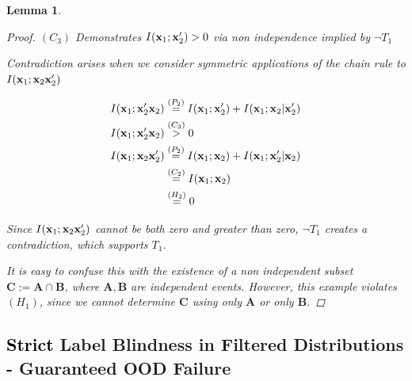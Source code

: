 \documentclass{article} %
\theoremstyle{plain}
\newtheorem{lemma}[theorem]{Lemma}
\theoremstyle{definition}
\theoremstyle{remark}
\begin{document}
\begin{lemma}
\begin{proof}
    $(C_3)$ Demonstrates $I({\mathbf{x}}_1;{\mathbf{x}}_2') > 0$ via non independence implied by $\neg T_1$
    
    Contradiction arises when we consider symmetric applications of the chain rule to $I({\mathbf{x}}_1;{\mathbf{x}}_2 {\mathbf{x}}_2')$

    $$
    \begin{aligned}
    I({\mathbf{x}}_1;{\mathbf{x}}_2' {\mathbf{x}}_2) &\stackrel{\left(P_2\right)}{=} I({\mathbf{x}}_1;{\mathbf{x}}_2') + I({\mathbf{x}}_1;{\mathbf{x}}_2|{\mathbf{x}}_2') \\
    I({\mathbf{x}}_1;{\mathbf{x}}_2' {\mathbf{x}}_2) &\stackrel{\left(C_3\right)}{>} 0 \\
    I({\mathbf{x}}_1;{\mathbf{x}}_2 {\mathbf{x}}_2') &\stackrel{\left(P_2\right)}{=} I({\mathbf{x}}_1;{\mathbf{x}}_2) + I({\mathbf{x}}_1;{\mathbf{x}}_2'|{\mathbf{x}}_2) \\
    &\stackrel{\left(C_2\right)}{=} I({\mathbf{x}}_1;{\mathbf{x}}_2)\\
    &\stackrel{\left(H_2\right)}{=} 0 \\
    \end{aligned}
    $$
       
    Since $I({\mathbf{x}}_1;{\mathbf{x}}_2 {\mathbf{x}}_2')$ cannot be both zero and greater than zero, $\neg T_1$ creates a contradiction, which supports $T_1$. 

    It is easy to confuse this with the existence of a non independent subset $\mathbf{C} := \mathbf{A \cap B}$,  where $\mathbf{A}, \mathbf{B}$ are independent events. However, this example violates $(H_1)$, since we cannot determine $\mathbf{C}$ using only $\mathbf{A}$ or only $\mathbf{B}$.

    
    
\end{proof}
\label{filter}
\end{lemma}


\subsection{\textcolor{black}{Strict} Label Blindness in Filtered Distributions - Guaranteed OOD Failure }
\end{document}
